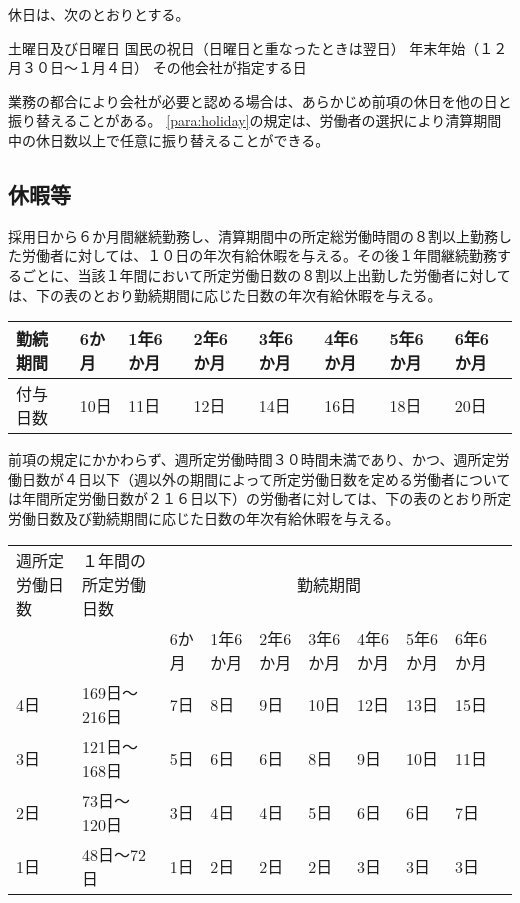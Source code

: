 \documentclass[10pt,a4paper,uplatex]{jsarticle}
\begin{document}
休日は、次のとおりとする。
\label{para:holiday}
\begin{enumerate}
    \itm 土曜日及び日曜日
    \itm 国民の祝日（日曜日と重なったときは翌日）
    \itm 年末年始（１２月３０日～１月４日）
    \itm その他会社が指定する日
\end{enumerate}
\term
業務の都合により会社が必要と認める場合は、あらかじめ前項の休日を他の日と振り替えることがある。
\term
\ref{para:holiday}の規定は、労働者の選択により清算期間中の休日数以上で任意に振り替えることができる。


\subsection{休暇等}
採用日から６か月間継続勤務し、清算期間中の所定総労働時間の８割以上勤務した労働者に対しては、１０日の年次有給休暇を与える。その後１年間継続勤務するごとに、当該１年間において所定労働日数の８割以上出勤した労働者に対しては、下の表のとおり勤続期間に応じた日数の年次有給休暇を与える。

\hspace{2cm}\begin{tabular}{|l|p{2.5em}|p{2.5em}|p{2.5em}|p{2.5em}|p{2.5em}|p{2.5em}|p{2.5em}|} \hline
  勤続期間 & 6か月 & 1年6か月& 2年6か月& 3年6か月& 4年6か月& 5年6か月& 6年6か月 \\ \hline \hline
  付与日数 & 10日 & 11日& 12日& 14日& 16日& 18日& 20日 \\ \hline
\end{tabular}

\label{para:paid_vacation}
\term
前項の規定にかかわらず、週所定労働時間３０時間未満であり、かつ、週所定労働日数が４日以下（週以外の期間によって所定労働日数を定める労働者については年間所定労働日数が２１６日以下）の労働者に対しては、下の表のとおり所定労働日数及び勤続期間に応じた日数の年次有給休暇を与える。

\hspace{2cm}\begin{tabular}{|p{3em}|p{6.5em}|p{2.5em}|p{2.5em}|p{2.5em}|p{2.5em}|p{2.5em}|p{2.5em}|p{2.5em}|p{2.5em}|} \hline
  週所定労働日数 & １年間の所定労働日数 & \multicolumn{7}{|c|}{勤続期間} \\ \cline{3-9}
  & & 6か月 & 1年6か月& 2年6か月& 3年6か月& 4年6か月& 5年6か月& 6年6か月 \\ \hline \hline
  4日 & 169日～216日 & 7日 & 8日& 9日& 10日& 12日& 13日& 15日 \\ \hline
  3日 & 121日～168日 & 5日 & 6日& 6日&  8日&  9日& 10日& 11日 \\ \hline
  2日 & 73日～120日  & 3日 & 4日& 4日&  5日&  6日&  6日&  7日 \\ \hline
  1日 & 48日～72日   & 1日 & 2日& 2日&  2日&  3日&  3日&  3日 \\ \hline
\end{tabular}
\end{document}
